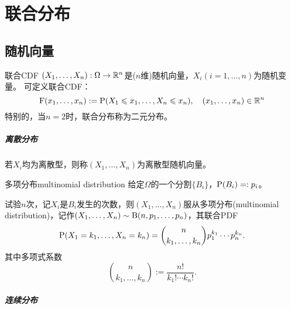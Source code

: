 \chapter{联合分布}

\section{随机向量}

\begin{definition}{联合CDF}{}
	$(X_1,\ldots,X_n):\Omega\to\RR^n$是($n$维)随机向量，$X_i(i=1,\ldots,n)$为随机变量。
	可定义联合CDF：
	\[
		\CDF(x_1,\ldots,x_n):=\P(X_1\leqslant x_1,\ldots,X_n\leqslant x_n),\quad(x_1,\ldots,x_n)\in\RR^n
	\]
	特别的，当$n=2$时，联合分布称为二元分布。
\end{definition}

\paragraph{离散分布}

若$X_i$均为离散型，则称$(X_1,\ldots,X_n)$为离散型随机向量。

\begin{example}{多项分布}{multinomial distribution}
	给定$\Omega$的一个分割$\{B_i\}$，$\P(B_i)=:p_i$。
	
	试验$n$次，记$X_i$是$B_i$发生的次数，则$(X_1,\ldots,X_n)$服从多项分布(multinomial distribution)，记作$(X_1,\ldots,X_n)\sim\Bern(n,p_1,\ldots,p_n)$，其联合PDF
	\[
		\P(X_1=k_1,\ldots,X_n=k_n)=\binom{n}{k_1,\ldots,k_n}p_1^{k_1}\cdots p_n^{k_n}.
	\]
	其中多项式系数
	\[
		\binom{n}{k_1,\ldots,k_n}:=\frac{n!}{k_1!\cdots k_n!}.
	\]
\end{example} 

\paragraph{连续分布}

